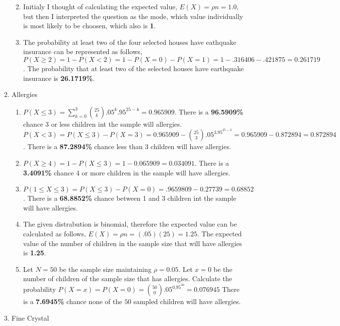 \documentclass[12pt, letterpaper]{article}
\begin{document}
\begin{enumerate}
\begin{enumerate}
			\item Initialy I thought of calculating the expected value, $E(X) = \rho n = 1.0$, but then I interpreted the question as the mode, which value individually is most likely to be choosen, which also is \textbf{1}.
			\item The probability at least two of the four selected houses have eathquake insurance can be represented as follows, $P(X \ge 2) = 1 - P(X < 2) = 1 - P(X=0) - P(X=1) = 1 - .316406 - .421875 = 0.261719$. The probability that at least two of the selected houses have earthquake insurance is \textbf{26.1719\%}.
		\end{enumerate}
	\item Allergies
		\begin{enumerate}
			\item $P(X \le 3) = \sum_{k=0}^{3} {25\choose k}.05^k.95^{25-k} = 0.965909$. There is a \textbf{96.5909\%} chance 3 or less children int the sample will allergies. $P(X < 3) = P(X \le 3) - P(X = 3) = 0.965909 - {25\choose 3}.05^3.95^{25-3} = 0.965909 - 0.872894 = 0.872894$. There is a \textbf{87.2894\%} chance less than 3 children will have allergies.
			\item $P(X \ge 4) = 1 - P(X \le 3) = 1 - 0.065909 = 0.034091$. There is a \textbf{3.4091\%} chance 4 or more children in the sample will have allergies.
			\item $P(1 \le X \le 3) = P(X \le 3) - P(X = 0) = .9659809 - 0.27739 = 0.68852$. There is a \textbf{68.8852\%} chance between 1 and 3 children int the sample will have allergies.
			\item The given distrabution is binomial, therefore the expected value can be calculated as follows, $E(X) = \rho n = (.05)(25) = 1.25$. The expected value of the number of children in the sample size that will have allergies is \textbf{1.25}.
			\item Let $N = 50$ be the sample size maintaining $\rho = 0.05$. Let $x = 0$ be the number of children of the sample size that has allergies. Calculate the probability $P(X = x) = P(X = 0) = {50\choose0}.05^0.95^{50} = 0.076945$ There is a \textbf{7.6945\%} chance none of the $50$ sampled children will have allergies.
		\end{enumerate}
	\item Fine Crystal

\end{enumerate}
\end{document}
